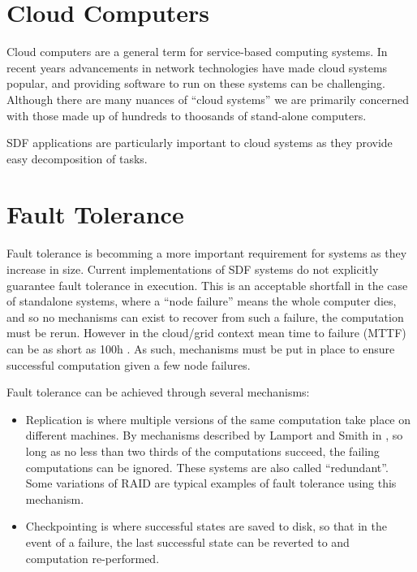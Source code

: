 \section{Cloud Computers}
Cloud computers are a general term for service-based computing systems.
In recent years advancements in network technologies have made cloud systems popular, and providing software to run on these systems can be challenging.
Although there are many nuances of ``cloud systems'' we are primarily concerned with those made up of hundreds to thoosands of stand-alone computers.

SDF applications are particularly important to cloud systems as they provide easy decomposition of tasks.

\section{Fault Tolerance}
Fault tolerance is becomming a more important requirement for systems as they increase in size.
Current implementations of SDF systems \cite{mal08, thies02, thies10} do not explicitly guarantee fault tolerance in execution.
This is an acceptable shortfall in the case of standalone systems, where a ``node failure'' means the whole computer dies, and so no mechanisms can exist to recover from such a failure, the computation must be rerun.
However in the cloud/grid context mean time to failure (MTTF) can be as short as 100h \cite{ree06}.
As such, mechanisms must be put in place to ensure successful computation given a few node failures.

Fault tolerance can be achieved through several mechanisms:
\begin{itemize}
	\item Replication is where multiple versions of the same computation take place on different machines.  By mechanisms described by Lamport and Smith in \cite{lam86}, so long as no less than two thirds of the computations succeed, the failing computations can be ignored.
			These systems are also called ``redundant''.  Some variations of RAID are typical examples of fault tolerance using this mechanism.
	\item Checkpointing is where successful states are saved to disk, so that in the event of a failure, the last successful state can be reverted to and computation re-performed.
\end{itemize}

